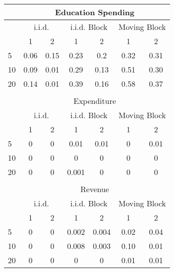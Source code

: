 \begin{tabular}{@{}lcccccc@{}}
	\toprule
	& \multicolumn{6}{c}{ Education Spending } \\ \hline
	& \multicolumn{2}{c}{ i.i.d. } & \multicolumn{2}{c}{ i.i.d. Block } & \multicolumn{2}{c}{ Moving Block } \\
\hline
	\diagbox{$\tau$}{$q$} & 1 & 2 & 1 & 2 & 1 & 2 \\
\hline
	5 & 0.06 & 0.15 & 0.23 & 0.2 & 0.32 & 0.31 \\
	10 & 0.09 & 0.01 & 0.29 & 0.13 & 0.51 & 0.30 \\
	20 & 0.14 & 0.01 & 0.39 & 0.16 & 0.58 & 0.37 \\
	 &  &  &  &  &  &  \\

	& \multicolumn{6}{c}{ Expenditure } \\\hline
	& \multicolumn{2}{c}{ i.i.d. } & \multicolumn{2}{c}{ i.i.d. Block } & \multicolumn{2}{c}{ Moving Block } \\
\hline
	\diagbox{$\tau$}{$q$} & 1 & 2 & 1 & 2 & 1 & 2 \\ \hline
	5 & 0 & 0 & 0.01 & 0.01 & 0 & 0.01 \\
	10 & 0 & 0 & 0 & 0 & 0 & 0 \\
	20 & 0 & 0 & 0.001 & 0 & 0 & 0 \\
		 &  &  &  &  &  &  \\
	& \multicolumn{6}{c}{ Revenue } \\\hline
	& \multicolumn{2}{c}{ i.i.d. } & \multicolumn{2}{c}{ i.i.d. Block } & \multicolumn{2}{c}{ Moving Block } \\
\hline
	\diagbox{$\tau$}{$q$} & 1 & 2 & 1 & 2 & 1 & 2 \\ \hline
	5 & 0 & 0 & 0.002 & 0.004 & 0.02 & 0.04 \\
	10 & 0 & 0 & 0.008 & 0.003 & 0.10 & 0.01 \\
	20 & 0 & 0 & 0 & 0 & 0.01 & 0.01 \\
	\bottomrule
\end{tabular}
